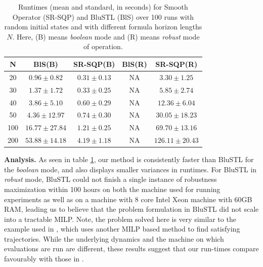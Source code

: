 \begin{table}[tb]
\small
\begin{center}
\caption{{\small Runtimes (mean and standard, in seconds) for Smooth Operator (SR-SQP) and BluSTL (BlS) over 100 runs with random initial states and with different formula horizon lengths $N$. Here, (B) means \textit{boolean} mode and (R) means \textit{robust} mode of operation.}}
\vspace{-5pt}
\label{tbl:time_performance_toy}
\begin{tabular} {|c|c|c|c|c|}
	\hline
	N & BlS(B) & SR-SQP(B) & BlS(R) & SR-SQP(R) \\ \hline
	20 & $0.96 \pm 0.82$ &  $\mathbf{0.31 \pm 0.13}$  & NA & $3.30 \pm 1.25$ \\ \hline
	30 & $1.37 \pm 1.72$ &  $\mathbf{0.33 \pm 0.25}$  & NA & $5.85 \pm 2.74$\\ \hline
	40 & $3.86 \pm 5.10$ &  $\mathbf{0.60 \pm 0.29}$  & NA & $12.36 \pm 6.04$\\ \hline
	50 & $4.36 \pm 12.97$&  $\mathbf{0.74 \pm 0.30}$ & NA & $30.05 \pm 18.23$\\ \hline
	100& $16.77 \pm 27.84$ & $\mathbf{1.21 \pm 0.25}$ & NA & $69.70 \pm 13.16$ \\ \hline
	200& $53.88 \pm 14.18$& $\mathbf{4.19 \pm 1.18}$ & NA & $126.11 \pm 20.43$ \\ \hline
\end{tabular}	
\end{center}
\end{table}

\textbf{Analysis.}
As seen in table \ref{tbl:time_performance_toy}, our method is consistently faster than BluSTL for the \textit{boolean} mode, and also displays smaller variances in runtimes. For BluSTL in \textit{robust} mode, BluSTL could not finish a single instance of robustness maximization within 100 hours on both the machine used for running experiments as well as on a machine with 8 core Intel Xeon machine with 60GB RAM, leading us to believe that the problem formulation in BluSTL did not scale into a tractable MILP. Note, the problem solved here is very similar to the example used in \cite{Saha_acc16}, which uses another MILP based method to find satisfying trajectories. While the underlying dynamics and the machine on which evaluations are run are different, these results suggest that our run-times compare favourably with those in \cite{Saha_acc16}.

